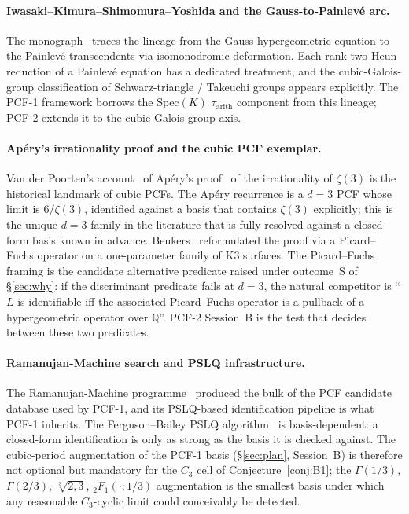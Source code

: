 \documentclass[11pt,a4paper]{article}
\theoremstyle{definition}
\theoremstyle{remark}
\newcommand{\Q}{\mathbb{Q}}
\begin{document}
\paragraph{Iwasaki--Kimura--Shimomura--Yoshida and the Gauss-to-Painlev\'e
arc.}
The monograph~\cite{Iwasaki1991} traces the lineage from the
Gauss hypergeometric equation to the Painlev\'e transcendents via
isomonodromic deformation. Each rank-two Heun reduction of a Painlev\'e
equation has a dedicated treatment, and the cubic-Galois-group
classification of Schwarz-triangle / Takeuchi groups
appears explicitly. The PCF-1 framework borrows the Spec$(K)$
$\tau_{\mathrm{arith}}$ component from this lineage; PCF-2 extends it to
the cubic Galois-group axis.

\paragraph{Ap\'ery's irrationality proof and the cubic PCF
exemplar.}
Van der Poorten's account~\cite{vanderPoorten1979} of
Ap\'ery's proof~\cite{Apery1979} of the irrationality of $\zeta(3)$ is
the historical landmark of cubic PCFs. The Ap\'ery recurrence is a
$d=3$ PCF whose limit is $6/\zeta(3)$, identified against a basis
that contains $\zeta(3)$ explicitly; this is the unique $d=3$ family
in the literature that is fully resolved against a closed-form basis
known in advance. Beukers~\cite{Beukers1979} reformulated the proof
via a Picard--Fuchs operator on a one-parameter family of K3
surfaces. The Picard--Fuchs framing is the candidate alternative
predicate raised under outcome~S of \S\ref{sec:why}: if the
discriminant predicate fails at $d=3$, the natural competitor is
``$L$ is identifiable iff the associated Picard--Fuchs operator
is a pullback of a hypergeometric operator over $\Q$''. PCF-2
Session~B is the test that decides between these two predicates.

\paragraph{Ramanujan-Machine search and PSLQ infrastructure.}
The Ramanujan-Machine programme~\cite{Raayoni2021} produced the bulk of
the PCF candidate database used by PCF-1, and its PSLQ-based
identification pipeline is what PCF-1 inherits. The
Ferguson--Bailey PSLQ algorithm~\cite{FergusonBailey1992} is
basis-dependent: a closed-form identification is only as strong as the
basis it is checked against. The cubic-period augmentation of the
PCF-1 basis (\S\ref{sec:plan}, Session~B) is therefore not optional
but mandatory for the $C_{3}$ cell of Conjecture~\ref{conj:B1}; the
$\Gamma(1/3)$, $\Gamma(2/3)$, $\sqrt[3]{2,3}$, ${}_{2}F_{1}(\cdot;1/3)$
augmentation is the smallest basis under which any reasonable
$C_{3}$-cyclic limit could conceivably be detected.
\end{document}
